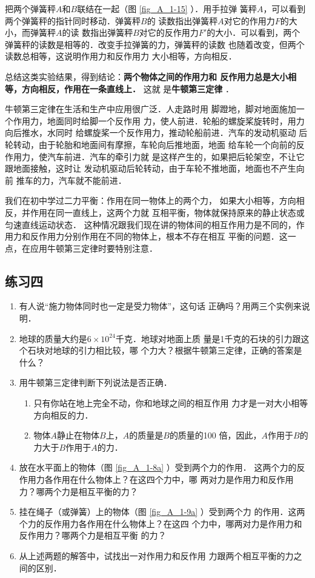     把两个弹簧秤$A$和$B$联结在一起（图 \ref{fig_A_1-15} ）．用手拉弹
簧秤$A$，可以看到两个弹簧秤的指针同时移动．弹簧秤$B$的
读数指出弹簧秤$A$对它的作用力$F$的大小，而弹簧秤$A$的读
数指出弹簧秤$B$对它的反作用力$F'$的大小．可以看到，两个
弹簧秤的读数是相等的．改变手拉弹簧的力，弹簧秤的读数
也随着改变，但两个读数总相等，这说明作用力和反作用力
大小相等，方向相反．

    总结这类实验结果，得到结论：\textbf{两个物体之间的作用力和
反作用力总是大小相等，方向相反，作用在一条直线上．} 这就
是\textbf{牛顿第三定律} ．

牛顿第三定律在生活和生产中应用很广泛．人走路时用
脚蹬地，脚对地面施加一个作用力，地面同时给脚一个反作用
力，使人前进．轮船的螺旋桨旋转时，用力向后推水，水同时
给螺旋桨一个反作用力，推动轮船前进．汽车的发动机驱动
后轮转动，由于轮胎和地面间有摩擦，车轮向后推地面，地面
给车轮一个向前的反作用力，使汽车前进．汽车的牵引力就
是这样产生的，如果把后轮架空，不让它跟地面接触，这时让
发动机驱动后轮转动，由于车轮不推地面，地面也不产生向前
推车的力，汽车就不能前进．

    我们在初中学过二力平衡：作用在同一物体上的两个力，
如果大小相等，方向相反，并作用在同一直线上，这两个力就
互相平衡，物体就保持原来的静止状态或匀速直线运动状态．
这种情况跟我们现在讲的物体间的相互作用力是不同的，作
用力和反作用力分别作用在不同的物体上，根本不存在相互
平衡的问题．这一点，在应用牛顿第三定律时要特别注意．


\subsection*{练习四} 
\begin{enumerate} 
\item  有人说“施力物体同时也一定是受力物体”，这句话
正确吗？用两三个实例来说明．

\item  地球的质量大约是$6\times 10^{24} $千克．地球对地面上质
量是1千克的石块的引力跟这个石块对地球的引力相比较，哪
个力大？根据牛顿第三定律，正确的答案是什么？

\item  用牛顿第三定律判断下列说法是否正确．
\begin{enumerate} 
\item  只有你站在地上完全不动，你和地球之间的相互作用
力才是一对大小相等方向相反的力．
\item  物体$A$静止在物体$B$上，$A$的质量是$B$的质量的100
倍，因此，$A$作用于$B$的力大于$B$作用于$A$的力．
\end{enumerate} 

\item  放在水平面上的物体（图 \ref{fig_A_1-8a} ）受到两个力的作用．
这两个力的反作用力各作用在什么物体上？在这四个力中，哪
两对力是作用力和反作用力？哪两个力是相互平衡的力？
\item  挂在绳子（或弹簧）上的物体（图 \ref{fig_A_1-9a} ）受到两个力
的作用．这两个力的反作用力各作用在什么物体上？在这四
个力中，哪两对力是作用力和反作用力？哪两个力是相互平衡
的力？
\item 从上述两题的解答中，试找出一对作用力和反作用
力跟两个相互平衡的力之间的区别．

\end{enumerate} 

